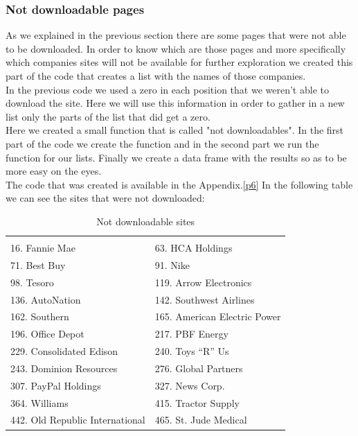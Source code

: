 \documentclass{article}
\begin{document}
\subsubsection{Not downloadable pages}
As we explained in the previous section there are some pages that were not able to be downloaded. In order to know which are those pages and more specifically which companies sites will not be available for further exploration we created this part of the code that creates a list with the names of those companies.\\
In the previous code we used a zero in each position that we weren't able to download the site. Here we will use this information in order to gather in a new list only the parts of the list that did get a zero.\\
Here we created a small function that is called "not downloadables". In the first part of the code we create the function and in the second part we run the function for our lists. Finally we create a data frame with the results so as to be more easy on the eyes.\\
The code that was created is available in the Appendix.\ref{p6}
In the following table we can see the sites that were not downloaded: 
\begin{table}[H]
\centering
\caption{Not downloadable sites}
\begin{tabular}{ll}
\hline
 &  \\ 
16. Fannie Mae 
& 63. HCA Holdings \\
71. Best Buy
& 91. Nike \\
98. Tesoro 
& 119. Arrow Electronics\\
136. AutoNation
& 142. Southwest Airlines \\
162. Southern 
& 165. American Electric Power\\
196. Office Depot 
& 217. PBF Energy \\
229. Consolidated Edison
& 240. Toys “R” Us \\
243. Dominion Resources 
& 276. Global Partners\\
307. PayPal Holdings 
& 327. News Corp. \\
364. Williams 
& 415. Tractor Supply\\ 
442. Old Republic International 
& 465. St. Jude Medical \\
\hline
\end{tabular}
\end{table}
\end{document}

